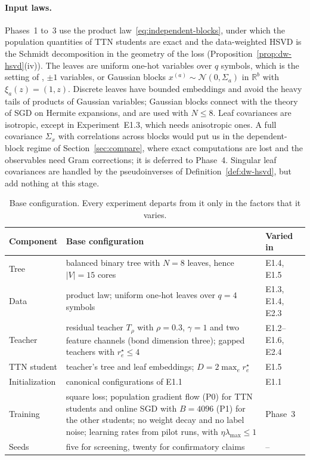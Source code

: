 \documentclass[11pt]{article}
\newcommand{\R}{\mathbb{R}}
\theoremstyle{definition}
\numberwithin{equation}{section}
\begin{document}
\paragraph{Input laws.}
Phases~1 to~3 use the product law~\eqref{eq:independent-blocks}, under which the population quantities of TTN students are exact and the data-weighted HSVD is the Schmidt decomposition in the geometry of the loss (Proposition~\ref{prop:dw-hsvd}(iv)). The leaves are uniform one-hot variables over $q$ symbols, which is the setting of \citet{furman2026benign}, $\pm1$ variables, or Gaussian blocks $x^{(a)}\sim\mathcal N(0,\Sigma_a)$ in $\R^b$ with $\xi_a(z)=(1,z)$. Discrete leaves have bounded embeddings and avoid the heavy tails of products of Gaussian variables; Gaussian blocks connect with the theory of SGD on Hermite expansions, and are used with $N\le8$. Leaf covariances are isotropic, except in Experiment~E1.3, which needs anisotropic ones. A full covariance $\Sigma_x$ with correlations across blocks would put us in the dependent-block regime of Section~\ref{sec:compare}, where exact computations are lost and the observables need Gram corrections; it is deferred to Phase~4. Singular leaf covariances are handled by the pseudoinverses of Definition~\ref{def:dw-hsvd}, but add nothing at this stage.

\begin{table}[tbp]
\centering
\small
\renewcommand{\arraystretch}{1.25}
\begin{tabular}{p{}p{}p{}}
\hline
\raggedright Component & \raggedright Base configuration & \raggedright Varied in \tabularnewline
\hline
\raggedright Tree & \raggedright balanced binary tree with $N=8$ leaves, hence $|V|=15$ cores & \raggedright E1.4, E1.5 \tabularnewline
\raggedright Data & \raggedright product law; uniform one-hot leaves over $q=4$ symbols & \raggedright E1.3, E1.4, E2.3 \tabularnewline
\raggedright Teacher & \raggedright residual teacher $T_\rho$ with $\rho=0.3$, $\gamma=1$ and two feature channels (bond dimension three); gapped teachers with $r^\star_e\le4$ & \raggedright E1.2--E1.6, E2.4 \tabularnewline
\raggedright TTN student & \raggedright teacher's tree and leaf embeddings; $D=2\max_er^\star_e$ & \raggedright E1.5 \tabularnewline
\raggedright Initialization & \raggedright canonical configurations of E1.1 & \raggedright E1.1 \tabularnewline
\raggedright Training & \raggedright square loss; population gradient flow (P0) for TTN students and online SGD with $B=4096$ (P1) for the other students; no weight decay and no label noise; learning rates from pilot runs, with $\eta\lambda_{\max}\le1$ & \raggedright Phase~3 \tabularnewline
\raggedright Seeds & \raggedright five for screening, twenty for confirmatory claims & \raggedright -- \tabularnewline
\hline
\end{tabular}
\caption{Base configuration. Every experiment departs from it only in the factors that it varies.}
\label{tab:exp-base}
\end{table}
\end{document}
